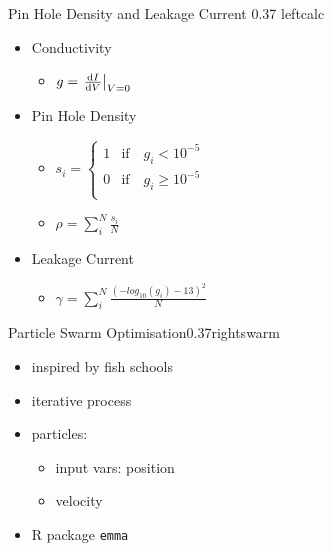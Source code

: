 \documentclass[hyperref={pdfpagelabels=false}, aspectratio=43, t]{beamer}  %
\begin{document}
\begin{graphicsFrame}
	{Pin Hole Density and Leakage Current}
	{}{0.37}
	{left}{calc}{}
	\vspace{2em}
	\begin{itemize}
		\item Conductivity
			\begin{itemize}
				\item $
					g = \eval{\dv{I}{V}}_{V =0}
					$
			\end{itemize}
	\vspace{0.5em}
		\item Pin Hole Density 
			\begin{itemize}
				\item $
	s_i = \begin{cases}
		1 &\text{if} \quad g_i < 10^{-5} \\
		0 &\text{if} \quad g_i \geq 10^{-5} \\
	\end{cases}
					$
				\item $
	\rho = \sum_i^N \frac{s_i}{N}
					$
			\end{itemize}
	\vspace{0.5em}
		\item Leakage Current 
			\begin{itemize}
				\item $
    \gamma = \sum_i^N \frac{ (-log_{10}(g_i) - 13)^2}{N}
	$
			\end{itemize}
	\end{itemize}
\end{graphicsFrame}
\begin{graphicsFrame}{Particle Swarm Optimisation}{}{0.37}{right}{swarm}{}
	\vspace{3em}
	\begin{itemize}
		\item inspired by fish schools %
		\item iterative process %
		\item particles: 
			\begin{itemize}
				\item input vars: position 
				\item velocity
			\end{itemize}
		\item R package \texttt{emma} 
	\end{itemize}
\end{graphicsFrame}
\end{document}
